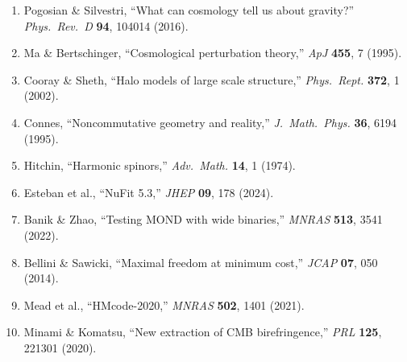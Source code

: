 \documentclass[11pt,a4paper]{article}
\begin{document}
\begin{enumerate}
\item Pogosian \& Silvestri, ``What can cosmology tell us about gravity?'' \textit{Phys.\ Rev.\ D} \textbf{94}, 104014 (2016).
\item Ma \& Bertschinger, ``Cosmological perturbation theory,'' \textit{ApJ} \textbf{455}, 7 (1995).
\item Cooray \& Sheth, ``Halo models of large scale structure,'' \textit{Phys.\ Rept.} \textbf{372}, 1 (2002).
\item Connes, ``Noncommutative geometry and reality,'' \textit{J.\ Math.\ Phys.} \textbf{36}, 6194 (1995).
\item Hitchin, ``Harmonic spinors,'' \textit{Adv.\ Math.} \textbf{14}, 1 (1974).
\item Esteban et al., ``NuFit 5.3,'' \textit{JHEP} \textbf{09}, 178 (2024).
\item Banik \& Zhao, ``Testing MOND with wide binaries,'' \textit{MNRAS} \textbf{513}, 3541 (2022).
\item Bellini \& Sawicki, ``Maximal freedom at minimum cost,'' \textit{JCAP} \textbf{07}, 050 (2014).
\item Mead et al., ``HMcode-2020,'' \textit{MNRAS} \textbf{502}, 1401 (2021).
\item Minami \& Komatsu, ``New extraction of CMB birefringence,'' \textit{PRL} \textbf{125}, 221301 (2020).
\end{enumerate}
\end{document}
